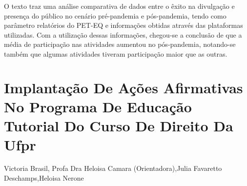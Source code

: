 O texto traz uma análise comparativa de dados entre o êxito na divulgação e presença do público no cenário pré-pandemia e pós-pandemia, tendo como parâmetro relatórios do PET-EQ e informações obtidas através das plataformas utilizadas. Com a utilização dessas informações, chegou-se a conclusão de que a média de participação nas atividades aumentou no pós-pandemia, notando-se também que algumas atividades tiveram participação maior que as outras.




\section*{Implantação De Ações Afirmativas No Programa De Educação Tutorial Do Curso De Direito Da Ufpr}

Victoria Brasil, Profa Dra Heloisa Camara (Orientadora),Julia Favaretto Deschamps,Heloisa Nerone

